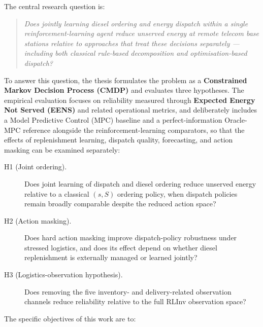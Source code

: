 The central research question is:

\begin{quote}
\emph{Does jointly learning diesel ordering and energy dispatch within a single
reinforcement-learning agent reduce unserved energy at remote telecom
base stations relative to approaches that treat these decisions separately ---
including both classical rule-based decomposition and optimisation-based
dispatch?}
\end{quote}

To answer this question, the thesis formulates the problem as a
\textbf{Constrained Markov Decision Process (CMDP)} and evaluates three
hypotheses. The empirical evaluation focuses on reliability
measured through \textbf{Expected Energy Not Served (EENS)} and related
operational metrics, and deliberately includes a Model Predictive Control
(MPC) baseline and a perfect-information Oracle-MPC reference alongside the
reinforcement-learning comparators, so that the effects of replenishment
learning, dispatch quality, forecasting, and action masking can be
examined separately:

\begin{description}
  \item[H1 (Joint ordering).] Does joint learning of dispatch and diesel
  ordering reduce unserved energy relative to a classical $(s,S)$ ordering
  policy, when dispatch policies remain broadly comparable despite the
  reduced action space?
\item[H2 (Action masking).] Does hard action masking improve dispatch-policy
robustness under stressed logistics, and does its effect depend on whether
diesel replenishment is externally managed or learned jointly?
  \item[H3 (Logistics-observation hypothesis).] Does removing the five inventory- and
  delivery-related observation channels reduce reliability relative to the
  full RLInv observation space?
\end{description}

The specific objectives of this work are to:

